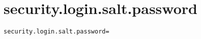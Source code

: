 \section{security.login.salt.password}
\label{configuration:SecurityLoginSaltPassword}
\ClearAPI
\TODO
{}
\begin{lstlisting}[style=Props,caption={Usage example for \textit{security.login.salt.password}}]
security.login.salt.password=
\end{lstlisting}